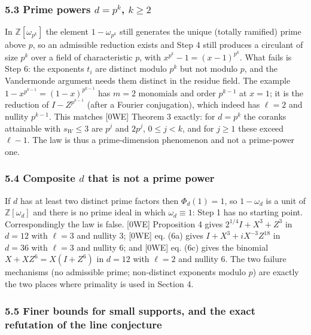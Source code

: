 \documentclass[
  11pt,
  a4paper,
]{article}
\begin{document}
\subsubsection{\texorpdfstring{5.3 Prime powers \(d=p^k\),
\(k\ge2\)}{5.3 Prime powers d=p\^{}k, k\textbackslash ge2}}\label{prime-powers-dpk-kge2}

In \(\mathbb Z[\omega_{p^k}]\) the element \(1-\omega_{p^k}\) still
generates the unique (totally ramified) prime above \(p\), so an
admissible reduction exists and Step 4 still produces a circulant of
size \(p^k\) over a field of characteristic \(p\), with
\(x^{p^k}-1=(x-1)^{p^k}\). What fails is Step 6: the exponents \(t_i\)
are distinct modulo \(p^k\) but not modulo \(p\), and the Vandermonde
argument needs them distinct in the residue field. The example
\(1-x^{p^{k-1}}=(1-x)^{p^{k-1}}\) has \(m=2\) monomials and order
\(p^{k-1}\) at \(x=1\); it is the reduction of \(I-Z^{p^{k-1}}\) (after
a Fourier conjugation), which indeed has \(\ell=2\) and nullity
\(p^{k-1}\). This matches {[}0WE{]} Theorem 3 exactly: for \(d=p^k\) the
coranks attainable with \(s_W\le3\) are \(p^j\) and \(2p^j\),
\(0\le j<k\), and for \(j\ge1\) these exceed \(\ell-1\). The law is thus
a prime-dimension phenomenon and not a prime-power one.

\subsubsection{\texorpdfstring{5.4 Composite \(d\) that is not a prime
power}{5.4 Composite d that is not a prime power}}\label{composite-d-that-is-not-a-prime-power}

If \(d\) has at least two distinct prime factors then \(\Phi_d(1)=1\),
so \(1-\omega_d\) is a unit of \(\mathbb Z[\omega_d]\) and there is no
prime ideal in which \(\omega_d\equiv1\): Step 1 has no starting point.
Correspondingly the law is false. {[}0WE{]} Proposition 4 gives
\(2^{1/4}I+X^3+Z^3\) in \(d=12\) with \(\ell=3\) and nullity \(3\);
{[}0WE{]} eq. (6a) gives \(I+X^3+iX^{-3}Z^{18}\) in \(d=36\) with
\(\ell=3\) and nullity \(6\); and {[}0WE{]} eq. (6c) gives the binomial
\(X+XZ^6=X(I+Z^6)\) in \(d=12\) with \(\ell=2\) and nullity \(6\). The
two failure mechanisms (no admissible prime; non-distinct exponents
modulo \(p\)) are exactly the two places where primality is used in
Section 4.

\subsubsection{5.5 Finer bounds for small supports, and the exact
refutation of the line
conjecture}\label{finer-bounds-for-small-supports-and-the-exact-refutation-of-the-line-conjecture}
\end{document}
